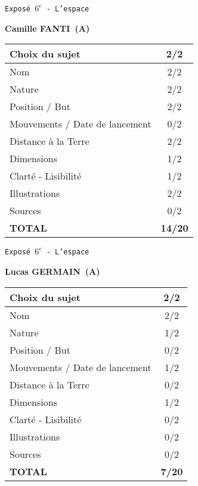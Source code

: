 	\vspace*{1cm}
	
	\newpage
	\LARGE{\texttt{Expos\'e $6^e$ - L'espace}}
	\vspace*{1cm}

	\textbf{Camille FANTI\ (A)}

	\vspace*{1.5cm}
	\begin{tabular}{|l|c|}
		\hline
		Choix du sujet & 2/2 \\
		\hline
		Nom & 2/2 \\
		\hline
		Nature & 2/2 \\
		\hline
		Position / But & 2/2 \\
		\hline
		Mouvements / Date de lancement & 0/2 \\
		\hline
		Distance \`a la Terre & 2/2 \\
		\hline
		Dimensions & 1/2 \\
		\hline
		Clart\'e - Lisibilit\'e & 1/2 \\
		\hline
		Illustrations & 2/2 \\
		\hline
		Sources & 0/2 \\
		\hline
		\textbf{TOTAL}  & \textbf{14/20} \\
		\hline
	\end{tabular}

	\vspace*{1cm}
	
	\newpage
	\LARGE{\texttt{Expos\'e $6^e$ - L'espace}}
	\vspace*{1cm}

	\textbf{Lucas GERMAIN\ (A)}

	\vspace*{1.5cm}
	\begin{tabular}{|l|c|}
		\hline
		Choix du sujet & 2/2 \\
		\hline
		Nom & 2/2 \\
		\hline
		Nature & 1/2 \\
		\hline
		Position / But & 0/2 \\
		\hline
		Mouvements / Date de lancement & 1/2 \\
		\hline
		Distance \`a la Terre & 0/2 \\
		\hline
		Dimensions & 1/2 \\
		\hline
		Clart\'e - Lisibilit\'e & 0/2 \\
		\hline
		Illustrations & 0/2 \\
		\hline
		Sources & 0/2 \\
		\hline
		\textbf{TOTAL}  & \textbf{7/20} \\
		\hline
	\end{tabular}

